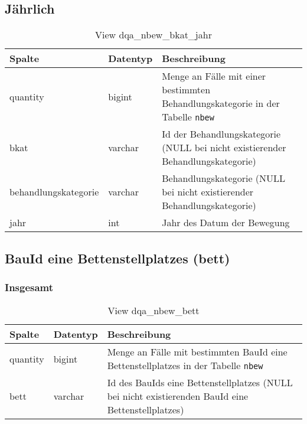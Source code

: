 \subsection{Jährlich} \label{subsubsec:behKatJ}

\begin{table}[ht]
	\centering   
	\caption{View dqa\_nbew\_bkat\_jahr}
	\label{tab:beweBkatJahr}
	\begin{tabular}{||l|l|p{10cm}||}   		
		\hline
		Spalte & Datentyp & Beschreibung \\ [0.5ex]
		\hline\hline
		quantity & bigint & Menge an Fälle mit einer bestimmten Behandlungskategorie in der Tabelle \texttt{nbew} \\
		\hline
		bkat & varchar & Id der Behandlungskategorie (NULL bei nicht existierender Behandlungskategorie)\\
		\hline
		behandlungskategorie & varchar & Behandlungskategorie (NULL bei nicht existierender Behandlungskategorie)\\
		\hline
		jahr & int &  Jahr des Datum der Bewegung \\
		\hline
		
	\end{tabular}
\end{table}

\subsection{BauId eine Bettenstellplatzes (bett)} \label{subsec:bett}

\subsubsection{Insgesamt} \label{subsubsec:bettI}

\begin{table}[ht]
	\centering   
	\caption{View dqa\_nbew\_bett}
	\label{tab:beweBettAll}
	\begin{tabular}{||l|l|p{10cm}||}   		
		\hline
		Spalte & Datentyp & Beschreibung \\ [0.5ex]
		\hline\hline
		quantity & bigint & Menge an Fälle mit bestimmten BauId eine Bettenstellplatzes in der Tabelle \texttt{nbew} \\
		\hline
		bett & varchar & Id des BauIds eine Bettenstellplatzes (NULL bei nicht existierenden BauId eine Bettenstellplatzes)\\
		\hline
		
	\end{tabular}
\end{table}

